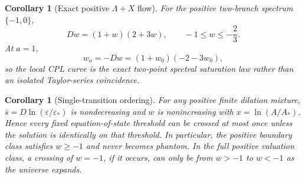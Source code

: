 \documentclass[11pt,a4paper]{article}
\def\Dil{D}%
\numberwithin{equation}{section}
\theoremstyle{definition}
\theoremstyle{plain}
\newtheorem{corollary}[criterion]{Corollary}
\theoremstyle{remark}
\newcommand{\Dil}{\mathscr{D}}
\begin{document}
\begin{corollary}[Exact positive \(\Lambda+X\) flow]
For the positive two-branch spectrum \(\{-1,0\}\),
\begin{equation}
\boxed{
\Dil w=(1+w)(2+3w),
\qquad
-1\le w\le-\frac23.
}
\end{equation}
At \(a=1\),
\begin{equation}
w_a=-\Dil w
=(1+w_0)(-2-3w_0),
\end{equation}
so the local CPL curve is the exact two-point spectral saturation law rather than an isolated Taylor-series coincidence.
\end{corollary}

\begin{corollary}[Single-transition ordering]
For any positive finite dilation mixture, \(\bar s=\Dil\ln(\varepsilon/\varepsilon_*)\) is nondecreasing and \(w\) is nonincreasing with \(x=\ln(A/A_*)\). Hence every fixed equation-of-state threshold can be crossed at most once unless the solution is identically on that threshold. In particular, the positive boundary class satisfies \(w\ge-1\) and never becomes phantom. In the full positive valuation class, a crossing of \(w=-1\), if it occurs, can only be from \(w>-1\) to \(w<-1\) as the universe expands.
\end{corollary}
\end{document}
